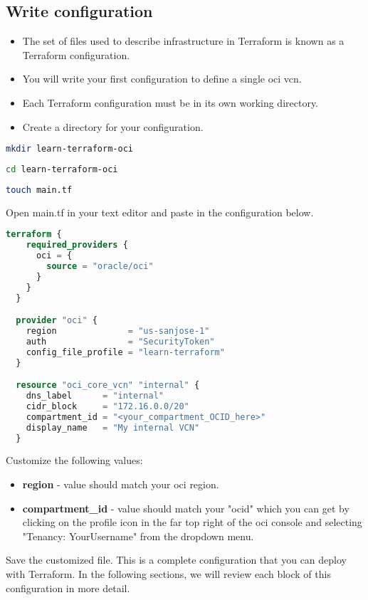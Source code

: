 \documentclass[../main.tex]{subfiles}
\begin{document}
\subsection{Write configuration}
\begin{itemize}
  \item The set of files used to describe infrastructure in Terraform is known as a Terraform configuration.
  \item You will write your first configuration to define a single \acrshort{oci} \acrshort{vcn}.
  \item Each Terraform configuration must be in its own working directory.
  \item Create a directory for your configuration.
\end{itemize}

\begin{lstlisting}[language=bash]
  mkdir learn-terraform-oci
\end{lstlisting}

\begin{lstlisting}[language=bash]
  cd learn-terraform-oci
\end{lstlisting}

\begin{lstlisting}[language=bash]
  touch main.tf
\end{lstlisting}

Open main.tf in your text editor and paste in the configuration below.
\begin{lstlisting}[language=Terraform]
  terraform {
    required_providers {
      oci = {
        source = "oracle/oci"
      }
    }
  }

  provider "oci" {
    region              = "us-sanjose-1"
    auth                = "SecurityToken"
    config_file_profile = "learn-terraform"
  }

  resource "oci_core_vcn" "internal" {
    dns_label      = "internal"
    cidr_block     = "172.16.0.0/20"
    compartment_id = "<your_compartment_OCID_here>"
    display_name   = "My internal VCN"
  }
\end{lstlisting}

Customize the following values:
\begin{itemize}
  \item {\textbf{region} - value should match your \acrshort{oci} region.}
  \item{\textbf{compartment\_id} - value should match your "\acrfull{ocid}" which you can get by clicking on the profile icon in the far top right of the \acrshort{oci} console and selecting "Tenancy: YourUsername" from the dropdown menu.}
\end{itemize}
Save the customized file.
This is a complete configuration that you can deploy with Terraform. In the following sections, we will review each block of this configuration in more detail.
\end{document}
